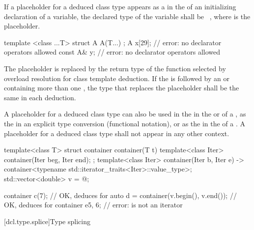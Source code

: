 \pnum
If a placeholder for a deduced class type
appears as a 
in the 
of an initializing declaration of a variable,
the declared type of the variable shall be \cv{}~,
where  is the placeholder.
\begin{example}
\begin{codeblock}
template <class ...T> struct A {
  A(T...) {}
};
A x[29]{};          // error: no declarator operators allowed
const A& y{};       // error: no declarator operators allowed
\end{codeblock}
\end{example}
The placeholder is replaced by the return type
of the function selected by overload resolution
for class template deduction.
If the 
is followed by an 
or 
containing more than one ,
the type that replaces the placeholder shall be the same in each deduction.

\pnum
A placeholder for a deduced class type
can also be used
in the 
in the  or 
of a ,
as the 
in an explicit type conversion (functional notation),
or
as the  in the 
of a .
A placeholder for a deduced class type
shall not appear in any other context.

\pnum
\begin{example}
\begin{codeblock}
template<class T> struct container {
    container(T t) {}
    template<class Iter> container(Iter beg, Iter end);
};
template<class Iter>
container(Iter b, Iter e) -> container<typename std::iterator_traits<Iter>::value_type>;
std::vector<double> v = { @\commentellip@ };

container c(7);                         // OK, deduces  for 
auto d = container(v.begin(), v.end()); // OK, deduces  for 
container e{5, 6};                      // error:  is not an iterator
\end{codeblock}
\end{example}

[dcl.type.splice]{Type splicing}

